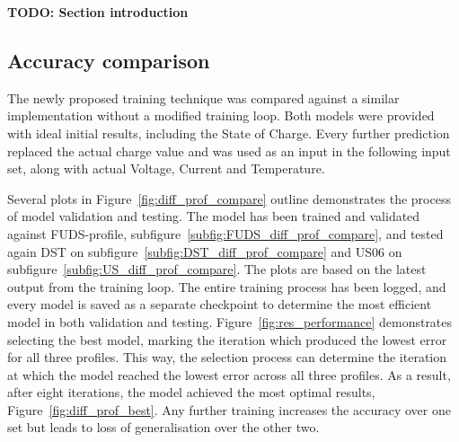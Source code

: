 \textbf{TODO: Section introduction}
\subsection{Accuracy comparison}
    The newly proposed training technique was compared against a similar implementation without a modified training loop.
    Both models were provided with ideal initial results, including the State of Charge.
    Every further prediction replaced the actual charge value and was used as an input in the following input set, along with actual Voltage, Current and Temperature.
    
    Several plots in \mbox{Figure~\ref{fig:diff_prof_compare}} outline demonstrates the process of model validation and testing.
    The model has been trained and validated against FUDS-profile, \mbox{subfigure~\ref{subfig:FUDS_diff_prof_compare}}, and tested again DST on \mbox{subfigure~\ref{subfig:DST_diff_prof_compare}} and US06 on \mbox{subfigure~\ref{subfig:US_diff_prof_compare}}.
    The plots are based on the latest output from the training loop.
    The entire training process has been logged, and every model is saved as a separate checkpoint to determine the most efficient model in both validation and testing.
    \mbox{Figure~\ref{fig:res_performance}} demonstrates selecting the best model, marking the iteration which produced the lowest error for all three profiles.
    This way, the selection process can determine the iteration at which the model reached the lowest error across all three profiles. 
    As a result, after eight iterations, the model achieved the most optimal results, \mbox{Figure~\ref{fig:diff_prof_best}}.
    Any further training increases the accuracy over one set but leads to loss of generalisation over the other two.

